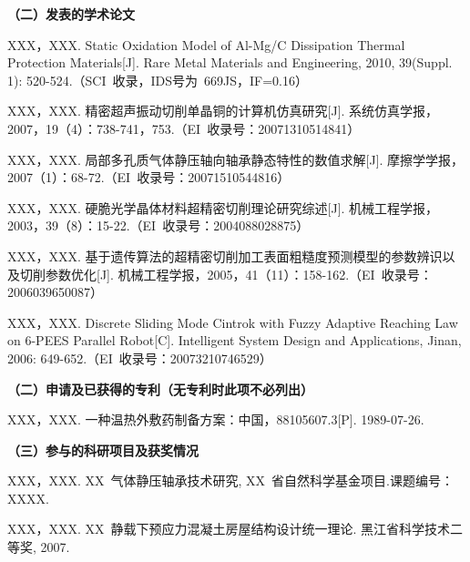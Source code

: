 
\begin{publications}{99}
    \noindent\textbf{（二）发表的学术论文}
    \begin{publist}
    \item	XXX，XXX. Static Oxidation Model of Al-Mg/C Dissipation Thermal Protection Materials[J]. Rare Metal Materials and Engineering, 2010, 39(Suppl. 1): 520-524.（SCI~收录，IDS号为~669JS，IF=0.16）
    \item XXX，XXX. 精密超声振动切削单晶铜的计算机仿真研究[J]. 系统仿真学报，2007，19（4）：738-741，753.（EI~收录号：20071310514841）
    \item XXX，XXX. 局部多孔质气体静压轴向轴承静态特性的数值求解[J]. 摩擦学学报，2007（1）：68-72.（EI~收录号：20071510544816）
    \item XXX，XXX. 硬脆光学晶体材料超精密切削理论研究综述[J]. 机械工程学报，2003，39（8）：15-22.（EI~收录号：2004088028875）
    \item XXX，XXX. 基于遗传算法的超精密切削加工表面粗糙度预测模型的参数辨识以及切削参数优化[J]. 机械工程学报，2005，41（11）：158-162.（EI~收录号：2006039650087）
    \item XXX，XXX. Discrete Sliding Mode Cintrok with Fuzzy Adaptive Reaching Law on 6-PEES Parallel Robot[C]. Intelligent System Design and Applications, Jinan, 2006: 649-652.（EI~收录号：20073210746529）
    \end{publist}
   
    \noindent\textbf{（二）申请及已获得的专利（无专利时此项不必列出）}
    \begin{publist}
    \item XXX，XXX. 一种温热外敷药制备方案：中国，88105607.3[P]. 1989-07-26.
    \end{publist}
   
    \noindent\textbf{（三）参与的科研项目及获奖情况}
    \begin{publist}
    \item	XXX，XXX. XX~气体静压轴承技术研究, XX~省自然科学基金项目.课题编号：XXXX.
    \item XXX，XXX. XX~静载下预应力混凝土房屋结构设计统一理论. 黑江省科学技术二等奖, 2007.
   \end{publist}
       
   \end{publications}
   